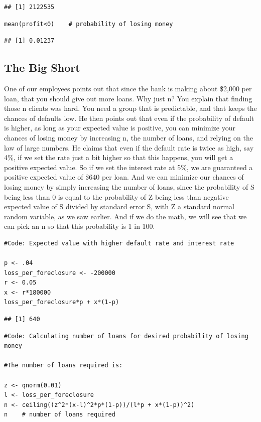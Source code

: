 \documentclass[
]{article}
\begin{document}
\begin{verbatim}
## [1] 2122535
\end{verbatim}

\begin{verbatim}
mean(profit<0)    # probability of losing money
\end{verbatim}

\begin{verbatim}
## [1] 0.01237
\end{verbatim}

\hypertarget{the-big-short}{%
\subsection{The Big Short}\label{the-big-short}}

One of our employees points out that since the bank is making about
\$2,000 per loan, that you should give out more loans. Why just n? You
explain that finding those n clients was hard. You need a group that is
predictable, and that keeps the chances of defaults low. He then points
out that even if the probability of default is higher, as long as your
expected value is positive, you can minimize your chances of losing
money by increasing n, the number of loans, and relying on the law of
large numbers. He claims that even if the default rate is twice as high,
say 4\%, if we set the rate just a bit higher so that this happens, you
will get a positive expected value. So if we set the interest rate at
5\%, we are guaranteed a positive expected value of \$640 per loan. And
we can minimize our chances of losing money by simply increasing the
number of loans, since the probability of S being less than 0 is equal
to the probability of Z being less than negative expected value of S
divided by standard error S, with Z a standard normal random variable,
as we saw earlier. And if we do the math, we will see that we can pick
an n so that this probability is 1 in 100.

\begin{verbatim}
#Code: Expected value with higher default rate and interest rate

p <- .04
loss_per_foreclosure <- -200000
r <- 0.05
x <- r*180000
loss_per_foreclosure*p + x*(1-p)
\end{verbatim}

\begin{verbatim}
## [1] 640
\end{verbatim}

\begin{verbatim}
#Code: Calculating number of loans for desired probability of losing money

#The number of loans required is:

z <- qnorm(0.01)
l <- loss_per_foreclosure
n <- ceiling((z^2*(x-l)^2*p*(1-p))/(l*p + x*(1-p))^2)
n    # number of loans required
\end{verbatim}
\end{document}
